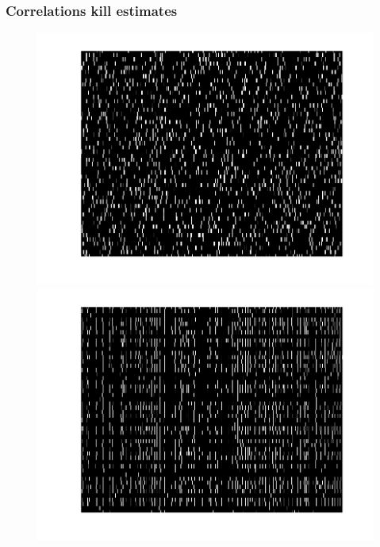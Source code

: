 \clearpage
\subsubsection{Correlations kill estimates}

\begin{figure}[h]
\centering
\begin{minipage}[c]{0.45\hsize}
\includegraphics[width=\hsize]{../figs/Figure7b_raster_weak}
\end{minipage}
\begin{minipage}[c]{0.45\hsize}
\includegraphics[width=\hsize]{../figs/Figure7a_raster_strong}
\end{minipage}
\begin{minipage}[c]{0.45\hsize}

\end{minipage}
\end{figure}
